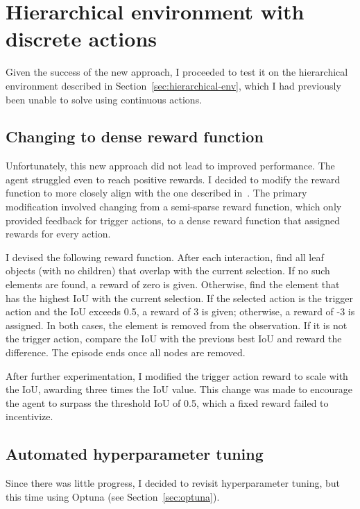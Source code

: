 \documentclass[
  digital,     %
  oneside,     %
  nosansbold,  %
  nocolorbold, %
  lof,         %
  lot,         %
]{fithesis4}
\begin{document}
\section{Hierarchical environment with discrete actions}

Given the success of the new approach, I proceeded to test it on the hierarchical environment described in Section~\ref{sec:hierarchical-env}, which I had previously been unable to solve using continuous actions.

\subsection{Changing to dense reward function}

Unfortunately, this new approach did not lead to improved performance. The agent struggled even to reach positive rewards. I decided to modify the reward function to more closely align with the one described in~\cite{iterative_od_with_rl}. The primary modification involved changing from a semi-sparse reward function, which only provided feedback for trigger actions, to a dense reward function that assigned rewards for every action.

I devised the following reward function. After each interaction, find all leaf objects (with no children) that overlap with the current selection. If no such elements are found, a reward of zero is given. Otherwise, find the element that has the highest IoU with the current selection. If the selected action is the trigger action and the IoU exceeds 0.5, a reward of 3 is given; otherwise, a reward of -3 is assigned. In both cases, the element is removed from the observation. If it is not the trigger action, compare the IoU with the previous best IoU and reward the difference. The episode ends once all nodes are removed.

After further experimentation, I modified the trigger action reward to scale with the IoU, awarding three times the IoU value. This change was made to encourage the agent to surpass the threshold IoU of 0.5, which a fixed reward failed to incentivize.

\subsection{Automated hyperparameter tuning}

Since there was little progress, I decided to revisit hyperparameter tuning, but this time using Optuna (see Section~\ref{sec:optuna}).
\end{document}
